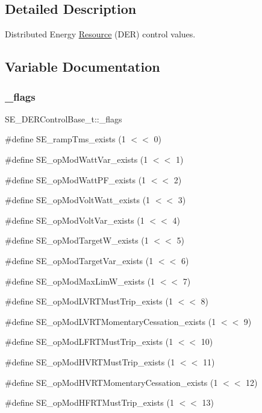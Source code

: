 \subsection{Detailed Description}
Distributed Energy \hyperlink{structResource}{Resource} (D\+ER) control values. 

\subsection{Variable Documentation}
\mbox{\label{group__DERControlBase_gaf48e1f28d437a79aba1ac66fb63ca37f}} 
\subsubsection{\texorpdfstring{\+\_\+flags}{\_flags}}
{\footnotesize\ttfamily S\+E\+\_\+\+D\+E\+R\+Control\+Base\+\_\+t\+::\+\_\+flags}

\#define S\+E\+\_\+ramp\+Tms\+\_\+exists (1 $<$$<$ 0)

\#define S\+E\+\_\+op\+Mod\+Watt\+Var\+\_\+exists (1 $<$$<$ 1)

\#define S\+E\+\_\+op\+Mod\+Watt\+P\+F\+\_\+exists (1 $<$$<$ 2)

\#define S\+E\+\_\+op\+Mod\+Volt\+Watt\+\_\+exists (1 $<$$<$ 3)

\#define S\+E\+\_\+op\+Mod\+Volt\+Var\+\_\+exists (1 $<$$<$ 4)

\#define S\+E\+\_\+op\+Mod\+Target\+W\+\_\+exists (1 $<$$<$ 5)

\#define S\+E\+\_\+op\+Mod\+Target\+Var\+\_\+exists (1 $<$$<$ 6)

\#define S\+E\+\_\+op\+Mod\+Max\+Lim\+W\+\_\+exists (1 $<$$<$ 7)

\#define S\+E\+\_\+op\+Mod\+L\+V\+R\+T\+Must\+Trip\+\_\+exists (1 $<$$<$ 8)

\#define S\+E\+\_\+op\+Mod\+L\+V\+R\+T\+Momentary\+Cessation\+\_\+exists (1 $<$$<$ 9)

\#define S\+E\+\_\+op\+Mod\+L\+F\+R\+T\+Must\+Trip\+\_\+exists (1 $<$$<$ 10)

\#define S\+E\+\_\+op\+Mod\+H\+V\+R\+T\+Must\+Trip\+\_\+exists (1 $<$$<$ 11)

\#define S\+E\+\_\+op\+Mod\+H\+V\+R\+T\+Momentary\+Cessation\+\_\+exists (1 $<$$<$ 12)

\#define S\+E\+\_\+op\+Mod\+H\+F\+R\+T\+Must\+Trip\+\_\+exists (1 $<$$<$ 13)

